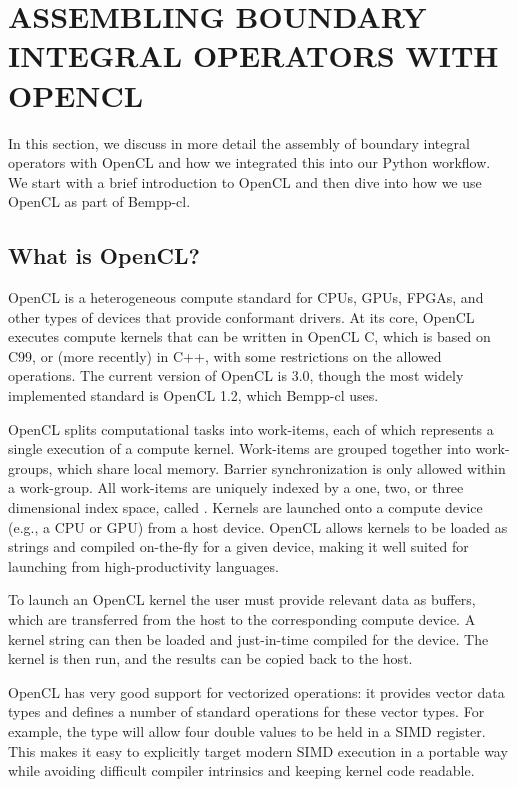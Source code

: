 \section{ASSEMBLING BOUNDARY INTEGRAL OPERATORS WITH OPENCL}

In this section, we discuss in more detail the assembly of boundary integral operators with OpenCL
and how we integrated this into our Python workflow. We start with a brief introduction to OpenCL and then
dive into how we use OpenCL as part of Bempp-cl.

\subsection{What is OpenCL?}

OpenCL \cite{opencl} is a heterogeneous compute standard for CPUs, GPUs, FPGAs, and other types of devices that provide conformant drivers. At its core, OpenCL executes compute kernels that can be written in OpenCL C, which is based on C99, or (more recently) in C++, with some restrictions on the allowed operations. The current version of OpenCL is 3.0, though the most widely implemented standard is OpenCL 1.2, which Bempp-cl uses.

OpenCL splits computational tasks into work-items, each of which represents a single execution of a compute kernel. Work-items are grouped together into work-groups, which share local memory. Barrier synchronization is only allowed within a work-group. All work-items are uniquely indexed by a one, two, or three dimensional index space, called . Kernels are launched onto a compute device (e.g., a CPU or GPU) from a host device. OpenCL allows kernels to be loaded as strings and compiled on-the-fly for a given device, making it well suited for launching from high-productivity languages.

To launch an OpenCL kernel the user must provide relevant data as buffers, which are transferred from the host to the corresponding compute device. A kernel string can then be loaded and just-in-time compiled for the device. The kernel is then run, and the results can be copied back to the host.

OpenCL has very good support for vectorized operations: it provides vector data types and defines a number of standard operations for these vector types. For example, the type \mbox{} will allow four double values to be held in a SIMD register. This makes it easy to explicitly target modern SIMD execution in a portable way while avoiding difficult compiler intrinsics and keeping kernel code readable.

